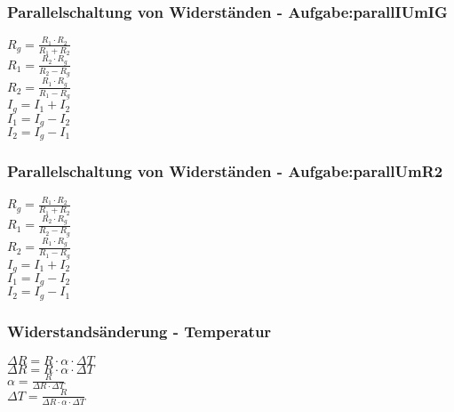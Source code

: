 \subsubsection{Parallelschaltung von Widerständen - Aufgabe:parallIUmIG} 
\begin{minipage}{0.45\textwidth} 
$ R_{g}  = \frac{R_{1} \cdot R_{2} }{R_{1} +R_{2} } $\\ 
$ R_{1}  = \frac{R_{2} \cdot R_{g} }{R_{2} -R_{g} } $\\ 
$ R_{2}  = \frac{R_{1} \cdot R_{g} }{R_{1} -R_{g} } $\\ 
$ I_{g}  = I_{1}  + I_{2} $\\ 
$ I_{1}  = I_{g}  - I_{2} $\\ 
$ I_{2}  = I_{g}  - I_{1} $\\ 
\end{minipage} 
\begin{minipage}{0.45\textwidth} 
 
\end{minipage} 
\subsubsection{Parallelschaltung von Widerständen - Aufgabe:parallUmR2} 
\begin{minipage}{0.45\textwidth} 
$ R_{g}  = \frac{R_{1} \cdot R_{2} }{R_{1} +R_{2} } $\\ 
$ R_{1}  = \frac{R_{2} \cdot R_{g} }{R_{2} -R_{g} } $\\ 
$ R_{2}  = \frac{R_{1} \cdot R_{g} }{R_{1} -R_{g} } $\\ 
$ I_{g}  = I_{1}  + I_{2} $\\ 
$ I_{1}  = I_{g}  - I_{2} $\\ 
$ I_{2}  = I_{g}  - I_{1} $\\ 
\end{minipage} 
\begin{minipage}{0.45\textwidth} 
 
\end{minipage} 
\subsubsection{Widerstandsänderung - Temperatur} 
\begin{minipage}{0.45\textwidth} 
$ \Delta R = R\cdot \alpha \cdot \Delta T $\\ 
$ \Delta R = R\cdot \alpha \cdot \Delta T $\\ 
$ \alpha  = \frac{R}{\Delta R\cdot \Delta T} $\\ 
$ \Delta T = \frac{   R}{\Delta R\cdot \alpha \cdot \Delta T} $\\ 
\end{minipage} 
\begin{minipage}{0.45\textwidth} 
 
\end{minipage} 
